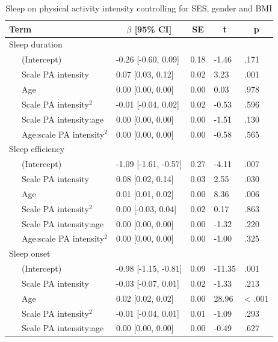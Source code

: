 \documentclass[
  man]{apa6}
\begin{document}
\begin{table}[tbp]

\begin{center}
\begin{threeparttable}

\caption{\label{tab:sleep-by-intensity}Sleep on physical activity intensity controlling for SES, gender and BMI}

\begin{tabular}{lllll}
\toprule
Term & \multicolumn{1}{c}{$\beta$ [95\% CI]} & \multicolumn{1}{c}{SE} & \multicolumn{1}{c}{t} & \multicolumn{1}{c}{p}\\
\midrule
Sleep duration &  &  &  & \\
\ \ \ (Intercept) & -0.26 [-0.60, 0.09] & 0.18 & -1.46 & .171\\
\ \ \ Scale PA intensity & 0.07 [0.03, 0.12] & 0.02 & 3.23 & .001\\
\ \ \ Age & 0.00 [0.00, 0.00] & 0.00 & 0.03 & .978\\
\ \ \ Scale PA intensity$^2$ & -0.01 [-0.04, 0.02] & 0.02 & -0.53 & .596\\
\ \ \ Scale PA intensity:age & 0.00 [0.00, 0.00] & 0.00 & -1.51 & .130\\
\ \ \ Age:scale PA intensity$^2$ & 0.00 [0.00, 0.00] & 0.00 & -0.58 & .565\\
Sleep efficiency &  &  &  & \\
\ \ \ (Intercept) & -1.09 [-1.61, -0.57] & 0.27 & -4.11 & .007\\
\ \ \ Scale PA intensity & 0.08 [0.02, 0.14] & 0.03 & 2.55 & .030\\
\ \ \ Age & 0.01 [0.01, 0.02] & 0.00 & 8.36 & .006\\
\ \ \ Scale PA intensity$^2$ & 0.00 [-0.03, 0.04] & 0.02 & 0.17 & .863\\
\ \ \ Scale PA intensity:age & 0.00 [0.00, 0.00] & 0.00 & -1.32 & .220\\
\ \ \ Age:scale PA intensity$^2$ & 0.00 [0.00, 0.00] & 0.00 & -1.00 & .325\\
Sleep onset &  &  &  & \\
\ \ \ (Intercept) & -0.98 [-1.15, -0.81] & 0.09 & -11.35 & .001\\
\ \ \ Scale PA intensity & -0.03 [-0.07, 0.01] & 0.02 & -1.33 & .213\\
\ \ \ Age & 0.02 [0.02, 0.02] & 0.00 & 28.96 & < .001\\
\ \ \ Scale PA intensity$^2$ & -0.01 [-0.04, 0.01] & 0.01 & -1.09 & .293\\
\ \ \ Scale PA intensity:age & 0.00 [0.00, 0.00] & 0.00 & -0.49 & .627\\

\end{tabular}
\end{threeparttable}
\end{center}
\end{table}
\end{document}
